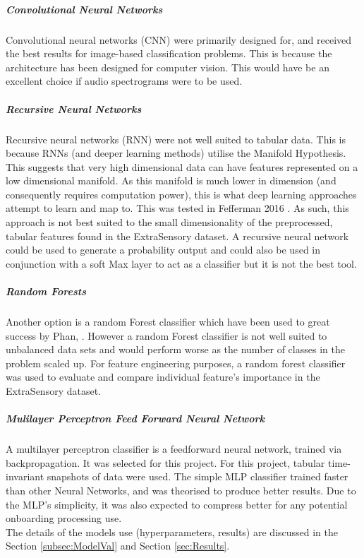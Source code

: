 \documentclass{UoNMCHA}
\newcommand{\inlineQuote}[1]{`` #1 ''}
\newcommand{\sref}[1] {Section \ref{#1}}
\numberwithin{equation}{section}
\begin{document}
\subparagraph{Convolutional Neural Networks}
Convolutional neural networks (CNN) were primarily designed for, and received the best results for image-based classification problems. This is because the architecture has been designed for computer vision. This would have be an excellent choice if audio spectrograms were to be used.

\subparagraph{Recursive Neural Networks}
Recursive neural networks (RNN) were not well suited to tabular data. This is because 
RNNs (and deeper learning methods) utilise the Manifold Hypothesis. This suggests that very high dimensional data can have features represented on a low dimensional manifold. As this manifold is much lower in dimension (and consequently requires computation power), this is what deep learning approaches attempt to learn and map to. This was tested in Fefferman 2016 \cite{Fefferman2016}.
As such, this approach is not best suited to the small dimensionality of the preprocessed, tabular features found in the ExtraSensory dataset. A recursive neural network could be used to generate a probability output and could also be used in conjunction with a soft Max layer to act as a classifier but it is not the best tool.


\subparagraph{Random Forests}
Another option is a random Forest classifier which have been used to great success by Phan, \cite{Phan2015}. However a random Forest classifier is not well suited to unbalanced data sets and would perform worse as the number of classes in the problem scaled up. For feature engineering purposes, a random forest classifier was used to evaluate and compare individual feature's importance in the ExtraSensory dataset.


\subparagraph{Mulilayer Perceptron Feed Forward Neural Network}
A multilayer perceptron classifier is a feedforward neural network, trained via backpropagation. It was selected for this project. For this project, tabular time-invariant snapshots of data were used. The simple MLP classifier trained faster than other Neural Networks, and was theorised to produce better results. Due to the MLP's simplicity, it was also expected to compress better for any potential onboarding processing use.\\

The details of the models use (hyperparameters, results) are discussed in the \sref{subsec:ModelVal} and \sref{sec:Results}.

\end{document}
